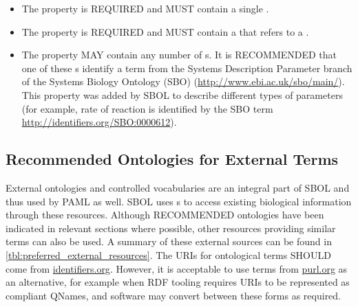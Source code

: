 \begin{itemize}
\item \label{sec:om:hasNumericalValue}
The  property is REQUIRED and MUST contain a single .

\item \label{sec:om:hasUnit:Measure}
The  property is REQUIRED and MUST contain a  that refers to a . 

\item \label{sec:sbol:type:Measure}
The  property MAY contain any number of s. It is RECOMMENDED that one of these s identify a term from the Systems Description Parameter branch of the Systems Biology Ontology (SBO) (\url{http://www.ebi.ac.uk/sbo/main/}). This  property was added by SBOL to describe different types of parameters 
(for example, rate of reaction is identified by the SBO term \url{http://identifiers.org/SBO:0000612}).
\end{itemize}

\subsection{Recommended Ontologies for External Terms}
\label{sec:recomm_ontologies}

External ontologies and controlled vocabularies are an integral part of SBOL and thus used by PAML as well. SBOL uses s to access existing biological information through these resources. 
Although RECOMMENDED ontologies have been indicated in relevant sections where possible, other resources providing similar terms can also be used. A summary of these external sources can be found in \ref{tbl:preferred_external_resources}.
The URIs for ontological terms SHOULD come from \url{identifiers.org}.  However, it is acceptable to use terms from \url{purl.org} as an alternative, for example when RDF tooling requires URIs to be represented as compliant QNames, and software may convert between these forms as required.

